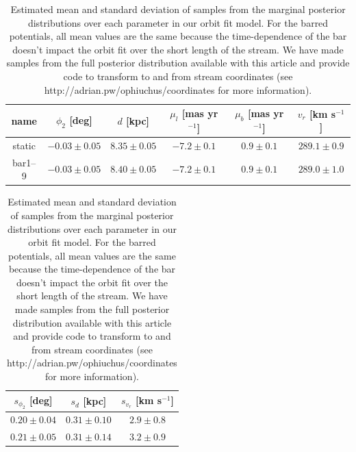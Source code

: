 \documentclass[letterpaper,12pt,preprint]{aastex}
\begin{document}
\begin{table}[ht]
\footnotesize
\begin{center}
	\begin{tabular}{cccccc}
	\toprule
	name & $\phi_2$ [deg] & $d$ [kpc] & $\mu_l$ [mas yr$^{-1}$] & $\mu_b$ [mas yr$^{-1}$] & $v_r$ [km s$^{-1}$]\\\midrule
	static & $-0.03\pm0.05$ & $8.35\pm0.05$ & $-7.2\pm0.1$ & $0.9\pm0.1$ & $289.1\pm0.9$\\
	bar1--9 & $-0.03\pm0.05$ & $8.40\pm0.05$ & $-7.2\pm0.1$ & $0.9\pm0.1$ & $289.0\pm1.0$\\
	\bottomrule
	\end{tabular}
	
	\begin{tabular}{ccc}
	\toprule
	$s_{\phi_2}$ [deg] & $s_{d}$ [kpc] & $s_{v_r}$ [km s$^{-1}$]\\\midrule
	$0.20\pm0.04$ & $0.31\pm0.10$ & $2.9\pm0.8$\\
	$0.21\pm0.05$ & $0.31\pm0.14$ & $3.2\pm0.9$\\
	\bottomrule
	\end{tabular}
	\caption{Estimated mean and standard deviation of samples from the marginal posterior distributions over each parameter in our orbit fit model. For the barred potentials, all mean values are the same because the time-dependence of the bar doesn't impact the orbit fit over the short length of the stream. We have made samples from the full posterior distribution available with this article and provide code to transform to and from stream coordinates (see http://adrian.pw/ophiuchus/coordinates for more information).\label{tbl:param-means} }
\end{center}
\end{table}
\end{document}
